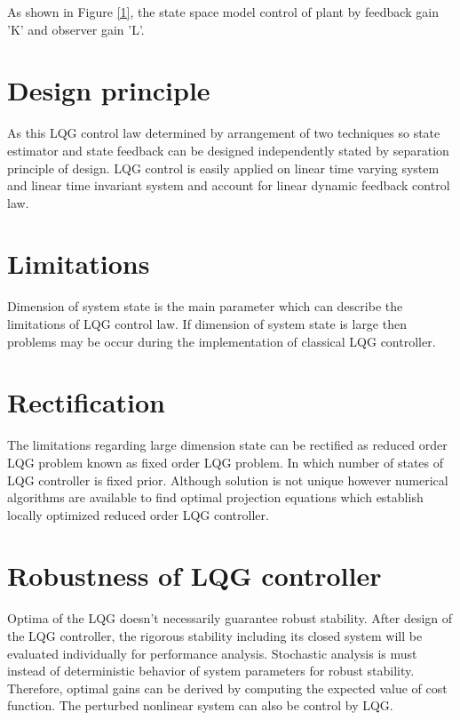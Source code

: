 \documentclass[12pt,a4paper]{article}
\begin{document}
As shown in Figure \ref{1}, the state space model control of  plant by feedback gain 'K' and observer gain 'L'.\cite{eide2011lqg}
\section*{Design principle}
As this LQG control law determined by arrangement of two techniques so state estimator and state feedback can be designed independently stated by separation principle of design. LQG control is easily applied on linear time varying system and linear time invariant system and account for linear dynamic feedback control law.\cite{lindquist1973feedback}
\section*{Limitations}
Dimension of system state is the main parameter which can describe the limitations of LQG control law. If dimension of system state is large then problems may be occur during the implementation of classical LQG controller. \cite{georgiou2013separation} \cite{van2000numerical}
\section*{Rectification}
The limitations regarding large dimension state can be rectified as reduced order LQG problem known as fixed order LQG problem. In which number of states of LQG controller is fixed prior. Although solution is not unique however numerical algorithms are available to find optimal projection equations which establish locally optimized reduced order LQG controller.\cite{georgiou2013separation} \cite{van2000numerical}
\section*{Robustness of LQG controller}
Optima of the LQG doesn't necessarily guarantee robust stability. After design of the LQG controller, the rigorous stability including its closed system will be evaluated individually for performance analysis. Stochastic analysis is must instead of deterministic behavior of system parameters for robust stability. Therefore, optimal gains can be derived by computing the expected value of cost function. The perturbed nonlinear system can also be control by LQG. \cite{van1999optimal}
\end{document}

